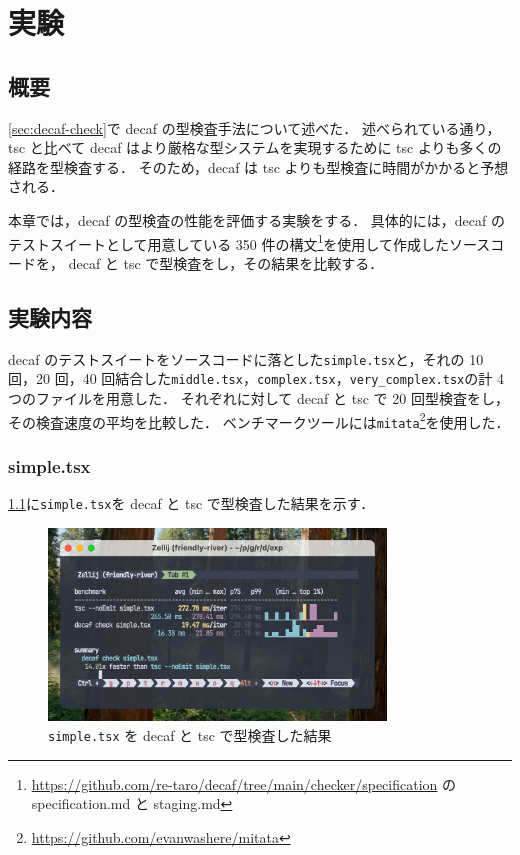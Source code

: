 \chapter{実験}

\section{概要}

\ref{sec:decaf-check}で decaf の型検査手法について述べた．
述べられている通り，tsc と比べて decaf はより厳格な型システムを実現するために tsc よりも多くの経路を型検査する．
そのため，decaf は tsc よりも型検査に時間がかかると予想される．

本章では，decaf の型検査の性能を評価する実験をする．
具体的には，decaf のテストスイートとして用意している 350 件の構文\footnote{\url{https://github.com/re-taro/decaf/tree/main/checker/specification} の specification.md と staging.md}を使用して作成したソースコードを，
decaf と tsc で型検査をし，その結果を比較する．

\section{実験内容}

decaf のテストスイートをソースコードに落とした\texttt{simple.tsx}と，それの 10 回，20 回，40 回結合した\texttt{middle.tsx}，\texttt{complex.tsx}，\texttt{very\_complex.tsx}の計 4 つのファイルを用意した．
それぞれに対して decaf と tsc で 20 回型検査をし，その検査速度の平均を比較した．
ベンチマークツールには\texttt{mitata}\footnote{\url{https://github.com/evanwashere/mitata}}を使用した．

\subsection{simple.tsx}
\label{sec:simple}

\ref{fig:simple}に\texttt{simple.tsx}を decaf と tsc で型検査した結果を示す．

\begin{figure}[H]
    \centering
    \includegraphics[width=0.8\textwidth]{figures/fig_exp_1_simple_tsx.png}
    \caption{\texttt{simple.tsx} を decaf と tsc で型検査した結果}
    \label{fig:simple}
\end{figure}

